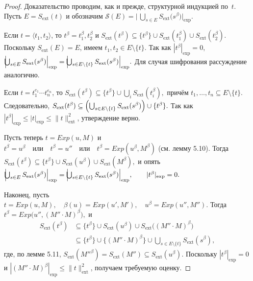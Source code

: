 \begin{proof}
Доказательство проводим, как и прежде, структурной индукцией по~$t$.
Пусть $E=S_{\text{ext}}(t)$ и обозначим
\(
  \mathcal S(E)=\bigl\lvert\,
        \bigcup_{s\in E} S_{\text{ext}}\!\bigl(s^{\beta}\bigr)
      \bigr\rvert_{\exp}.
\)

Если \(t=\langle t_{1},t_{2}\rangle\), то \(t^{\beta}=t_{1}^{\beta},t_{2}^{\beta}\) и 
\(
  S_{\text{ext}}(t^{\beta})
  \subseteq
  \{t^{\beta}\}\cup
  S_{\text{ext}}(t_{1}^{\beta})\cup
  S_{\text{ext}}(t_{2}^{\beta}).
\)
Поскольку \(S_{\text{ext}}(E)=E\), имеем \(t_{1},t_{2}\in E\setminus\{t\}\).
Так как \(|t^{\beta}|_{\exp}=0\),
\(
  \Bigl\lvert\!\!\bigcup_{s\in E}
     S_{\text{ext}}(s^{\beta})\Bigr\rvert_{\exp}
  =
  \Bigl\lvert\!\!\bigcup_{s\in E\setminus\{t\}}
     S_{\text{ext}}(s^{\beta})\Bigr\rvert_{\exp}.
\)
Для случая шифрования рассуждение аналогично.

Если \(t=t_{1}^{e_{1}}\!\cdots t_{n}^{e_{n}}\),
то
\(
  S_{\text{ext}}(t^{\beta})
  \subseteq
  \{t^{\beta}\}\cup\bigcup_{i} S_{\text{ext}}(t_{i}^{\beta}),
\)
причём \(t_{1},\dots,t_{n}\subseteq E\setminus\{t\}\).
Следовательно,
\(
  S_{\text{ext}}(t^{\beta})
  \subseteq
  \Bigl(\bigcup_{s\in E\setminus\{t\}}
          S_{\text{ext}}(s^{\beta})\Bigr)
  \cup\{t^{\beta}\}.
\)
Так как \(|t^{\beta}|_{\exp}\le |t|_{\exp}\le\|t\|_{\text{ext}}^{2}\),
утверждение верно.

Пусть теперь \(t=Exp(u,M)\) и
\(
  t^{\beta}=u^{\beta}\quad\text{или}\quad
  t^{\beta}=u''\quad\text{или}\quad
  t^{\beta}=Exp(u^{\beta},M^{\beta})
\)
(см. лемму 5.10).
Тогда
\(
  S_{\text{ext}}(t^{\beta})
  \subseteq
  \bigl\{t^{\beta}\bigr\}
  \cup S_{\text{ext}}(u^{\beta})
  \cup S_{\text{ext}}(M^{\beta}),
\)
и опять
\(
  \Bigl\lvert\!\!\bigcup_{s\in E}
     S_{\text{ext}}(s^{\beta})\Bigr\rvert_{\exp}
  =
  \Bigl\lvert\!\!\bigcup_{s\in E\setminus\{t\}}
     S_{\text{ext}}(s^{\beta})\Bigr\rvert_{\exp},
  \qquad |t^{\beta}|_{\exp}=0.
\)

Наконец, пусть
\(
  t= Exp(u,M),\quad
  \beta(u)= Exp(u',M'),\quad
  u^{\beta}= Exp(u'',M'').
\)
Тогда
\(
  t^{\beta}= Exp\!\bigl(u'',(M''\!\cdot M)^{\beta}\bigr),
\)
и
\[
\begin{aligned}
  S_{\text{ext}}(t^{\beta})
  &\subseteq
    \{t^{\beta}\}
    \cup S_{\text{ext}}(u^{\beta})
    \cup S_{\text{ext}}\!\bigl((M''\!\cdot M)^{\beta}\bigr) \\[2pt]
  &\subseteq
    \{t^{\beta}\}
    \cup\{(M''\!\cdot M)^{\beta}\}
    \cup\bigcup_{s\in E\setminus\{t\}} S_{\text{ext}}(s^{\beta}),
\end{aligned}
\]
где, по лемме 5.11,
\(S_{\text{ext}}(M''^{\beta})=S_{\text{ext}}(M'')\subseteq S_{\text{ext}}(u^{\beta})\).
Поскольку \(|t^{\beta}|_{\exp}=0\) и
\(|(M''\!\cdot M)^{\beta}|_{\exp}\le\|t\|_{\text{ext}}^{2}\),
получаем требуемую оценку.
\end{proof}

